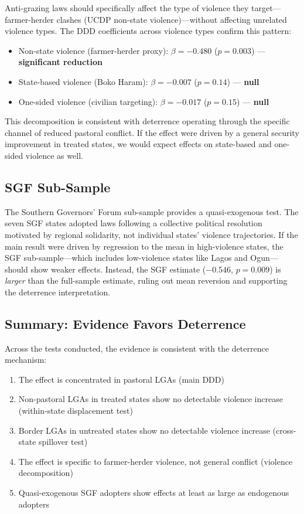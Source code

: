 \documentclass[12pt]{article}
\begin{document}
Anti-grazing laws should specifically affect the type of violence they target---farmer-herder clashes (UCDP non-state violence)---without affecting unrelated violence types. The DDD coefficients across violence types confirm this pattern:
\begin{itemize}
\item Non-state violence (farmer-herder proxy): $\beta = -0.480$ ($p = 0.003$) --- \textbf{significant reduction}
\item State-based violence (Boko Haram): $\beta = -0.007$ ($p = 0.14$) --- \textbf{null}
\item One-sided violence (civilian targeting): $\beta = -0.017$ ($p = 0.15$) --- \textbf{null}
\end{itemize}

This decomposition is consistent with deterrence operating through the specific channel of reduced pastoral conflict. If the effect were driven by a general security improvement in treated states, we would expect effects on state-based and one-sided violence as well.

\subsection{SGF Sub-Sample}

The Southern Governors' Forum sub-sample provides a quasi-exogenous test. The seven SGF states adopted laws following a collective political resolution motivated by regional solidarity, not individual states' violence trajectories. If the main result were driven by regression to the mean in high-violence states, the SGF sub-sample---which includes low-violence states like Lagos and Ogun---should show weaker effects. Instead, the SGF estimate ($-0.546$, $p = 0.009$) is \textit{larger} than the full-sample estimate, ruling out mean reversion and supporting the deterrence interpretation.

\subsection{Summary: Evidence Favors Deterrence}

Across the tests conducted, the evidence is consistent with the deterrence mechanism:
\begin{enumerate}
\item The effect is concentrated in pastoral LGAs (main DDD)
\item Non-pastoral LGAs in treated states show no detectable violence increase (within-state displacement test)
\item Border LGAs in untreated states show no detectable violence increase (cross-state spillover test)
\item The effect is specific to farmer-herder violence, not general conflict (violence decomposition)
\item Quasi-exogenous SGF adopters show effects at least as large as endogenous adopters
\end{enumerate}
\end{document}
